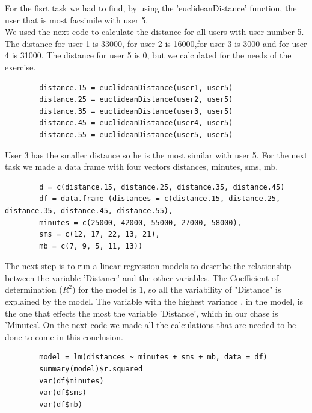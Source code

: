 \documentclass[10pt,a4paper]{article}
\begin{document}
	For the fisrt task we had to find, by using the 'euclideanDistance' function, the user that is most facsimile with user 5.\\
	We used the next code to calculate the distance for all users with user number 5.
	The distance for user 1 is 33000, for user 2 is 16000,for user 3 is 3000 and for user 4 is 31000. The distance for user 5 is 0, but we calculated for the needs of the exercise.
	\begin{lstlisting}
		distance.15 = euclideanDistance(user1, user5)
		distance.25 = euclideanDistance(user2, user5)
		distance.35 = euclideanDistance(user3, user5)
		distance.45 = euclideanDistance(user4, user5)
		distance.55 = euclideanDistance(user5, user5)
	\end{lstlisting}
	User 3  has the smaller distance so he is the most similar with user 5.
	\newpage
	For the next task we made a data frame with four vectors distances, minutes, sms, mb.
	\begin{lstlisting}
		d = c(distance.15, distance.25, distance.35, distance.45)
		df = data.frame (distances = c(distance.15, distance.25, distance.35, distance.45, distance.55),
		minutes = c(25000, 42000, 55000, 27000, 58000),
		sms = c(12, 17, 22, 13, 21),
		mb = c(7, 9, 5, 11, 13))
	\end{lstlisting}
	The next step is to run a linear regression models to describe the relationship between the variable 'Distance' and the other variables. The Coefficient of determination
	($R^{2}$) for the model is $1$, so all the variability of "Distance" is explained by the model. The variable with the highest variance , in the model, is the one that effects the most the variable 'Distance', which in our chase is 'Minutes'. On the next code we made all the calculations that are needed to be done to come in this conclusion.
	\begin{lstlisting}
		model = lm(distances ~ minutes + sms + mb, data = df)
		summary(model)$r.squared
		var(df$minutes)
		var(df$sms)
		var(df$mb)
	\end{lstlisting}
	\newpage
	
\end{document}
